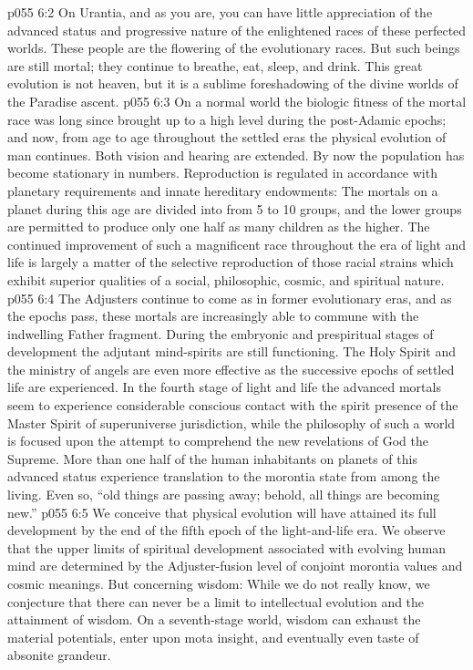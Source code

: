 \vs p055 6:2 On Urantia, and as you are, you can have little appreciation of the advanced status and progressive nature of the enlightened races of these perfected worlds. These people are the flowering of the evolutionary races. But such beings are still mortal; they continue to breathe, eat, sleep, and drink. This great evolution is not heaven, but it is a sublime foreshadowing of the divine worlds of the Paradise ascent.
\vs p055 6:3 On a normal world the biologic fitness of the mortal race was long since brought up to a high level during the post\hyp{}Adamic epochs; and now, from age to age throughout the settled eras the physical evolution of man continues. Both vision and hearing are extended. By now the population has become stationary in numbers. Reproduction is regulated in accordance with planetary requirements and innate hereditary endowments: The mortals on a planet during this age are divided into from 5 to 10 groups, and the lower groups are permitted to produce only one half as many children as the higher. The continued improvement of such a magnificent race throughout the era of light and life is largely a matter of the selective reproduction of those racial strains which exhibit superior qualities of a social, philosophic, cosmic, and spiritual nature.
\vs p055 6:4 \pc The Adjusters continue to come as in former evolutionary eras, and as the epochs pass, these mortals are increasingly able to commune with the indwelling Father fragment. During the embryonic and prespiritual stages of development the adjutant mind\hyp{}spirits are still functioning. The Holy Spirit and the ministry of angels are even more effective as the successive epochs of settled life are experienced. In the fourth stage of light and life the advanced mortals seem to experience considerable conscious contact with the spirit presence of the Master Spirit of superuniverse jurisdiction, while the philosophy of such a world is focused upon the attempt to comprehend the new revelations of God the Supreme. More than one half of the human inhabitants on planets of this advanced status experience translation to the morontia state from among the living. Even so, “old things are passing away; behold, all things are becoming new.”
\vs p055 6:5 We conceive that physical evolution will have attained its full development by the end of the fifth epoch of the light\hyp{}and\hyp{}life era. We observe that the upper limits of spiritual development associated with evolving human mind are determined by the Adjuster\hyp{}fusion level of conjoint morontia values and cosmic meanings. But concerning wisdom: While we do not really know, we conjecture that there can never be a limit to intellectual evolution and the attainment of wisdom. On a seventh\hyp{}stage world, wisdom can exhaust the material potentials, enter upon mota insight, and eventually even taste of absonite grandeur.
